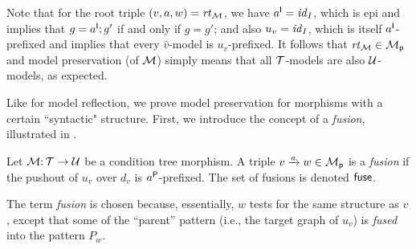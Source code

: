 Note that for the root triple $(v,a,w)=\rt\cM$, we have $a\I=\id_I$, which is epi and implies that $g=a\I;g'$ if and only if $g=g'$; and also $u_v=\id_I$, which is itself $a\I$-prefixed and implies that every $\hat v$-model is $u_v$-prefixed. It follows that $\rt\cM\in\cM_\pgen$ and model preservation (of $\cM$) simply means that all $\cT$-models are also $\cU$-models, as expected.
%
\begin{comment}
\begin{definition}[strong model preservation]
Let $\cM\of \cT\to\cU$ be a morphism and let $\trip vaw\in\cM$.
\begin{itemize}[topsep=\smallskipamount]
\item $a$ \emph{preserves} an $a\I$-prefixed $\hat v$-model $g=a\I;g'$ with witness $h$ if $h=a\P;h'$ for some $h'$ such that $g'\sat \hat w$ with witness $h'$.
		
\item Let $u:I_v\to P$ be an $a\I$-prefixed graph morphism. $a$ \emph{strongly preserves $u$-prefixed models} if $a$ preserves all $u$-prefixed $\hat v$-model/witness pairs.
		
\item $\cM$ strongly preserves models if $\rt\cM$ strongly preserves $\id$-prefixed models.
\end{itemize}
\end{definition}
\end{comment}
%
Like for model reflection, we prove model preservation for morphisms with a certain ``syntactic" structure. First, we introduce the concept of a \emph{fusion}, illustrated in .

\begin{definition}\label{def:fusion}
Let $\cM\of \cT\to\cU$ be a condition tree morphism. A triple $\trip vaw\in\cM_\pgen$ is a \emph{fusion} if the pushout of $u_v$ over $d_v$ is $a\P$-prefixed. The set of fusions is denoted $\fuse$.
\end{definition}
%
The term \emph{fusion} is chosen because, essentially, $w$ tests for the same structure as $v$, except that some of the ``parent'' pattern (i.e., the target graph of $u_v$) is \emph{fused} into the pattern $P_w$.

